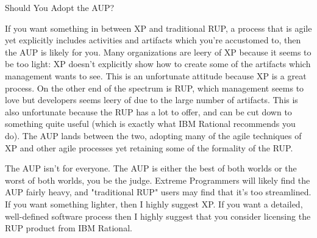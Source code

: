 \documentclass[spanish]{article}
\begin{document}
 
Should You Adopt the AUP?

If you want something in between XP and traditional RUP, a process that is agile yet explicitly includes activities and artifacts which you're accustomed to, then the AUP is likely for you.  Many organizations are leery of XP because it seems to be too light: XP doesn't explicitly show how to create some of the artifacts which management wants to see.  This is an unfortunate attitude because XP is a great process.  On the other end of the spectrum is RUP, which management seems to love but developers seems leery of due to the large number of artifacts.  This is also unfortunate because the RUP has a lot to offer, and can be cut down to something quite useful (which is exactly what IBM Rational recommends you do).  The AUP lands between the two, adopting many of the agile techniques of XP and other agile processes yet retaining some of the formality of the RUP. 

The AUP isn't for everyone. The AUP is either the best of both worlds or the worst of both worlds, you be the judge.  Extreme Programmers will likely find the AUP fairly heavy, and "traditional RUP" users may find that it's too streamlined.  If you want something lighter, then I highly suggest XP.  If you want a detailed, well-defined software process then I highly suggest that you consider licensing the RUP product from IBM Rational.  
\end{document}
